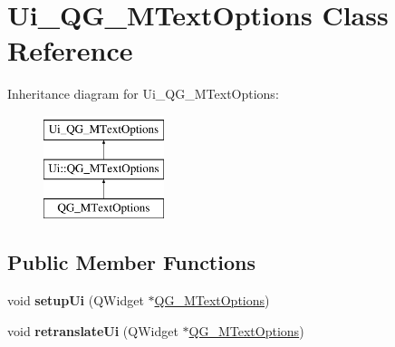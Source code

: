\hypertarget{classUi__QG__MTextOptions}{\section{Ui\-\_\-\-Q\-G\-\_\-\-M\-Text\-Options Class Reference}
\label{classUi__QG__MTextOptions}
}
Inheritance diagram for Ui\-\_\-\-Q\-G\-\_\-\-M\-Text\-Options\-:\begin{figure}[H]
\begin{center}
\leavevmode
\includegraphics[height=3.000000cm]{classUi__QG__MTextOptions}
\end{center}
\end{figure}
\subsection*{Public Member Functions}
\begin{DoxyCompactItemize}
\item 
\hypertarget{classUi__QG__MTextOptions_a2ea9e2464979f0fe1c21822ff9872885}{void {\bfseries setup\-Ui} (Q\-Widget $\ast$\hyperlink{classQG__MTextOptions}{Q\-G\-\_\-\-M\-Text\-Options})}\label{classUi__QG__MTextOptions_a2ea9e2464979f0fe1c21822ff9872885}

\item 
\hypertarget{classUi__QG__MTextOptions_a037cd3f518641aae0d5dba8932236fde}{void {\bfseries retranslate\-Ui} (Q\-Widget $\ast$\hyperlink{classQG__MTextOptions}{Q\-G\-\_\-\-M\-Text\-Options})}\label{classUi__QG__MTextOptions_a037cd3f518641aae0d5dba8932236fde}

\end{DoxyCompactItemize}

